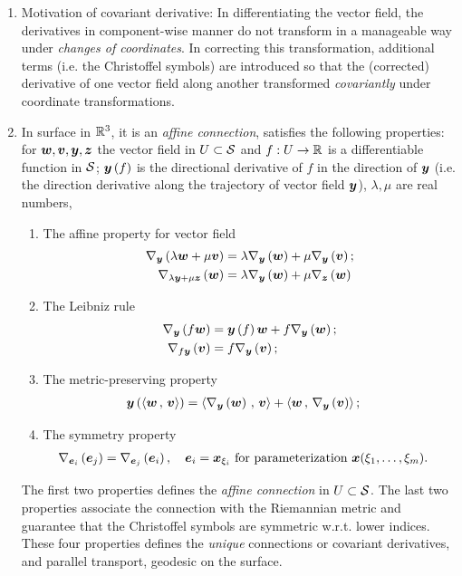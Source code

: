 \documentclass[11pt]{article}
\begin{document}
\begin{enumerate}
\item Motivation of covariant derivative: In differentiating the vector field, the derivatives in component-wise manner do not transform in a manageable way under \emph{changes of coordinates}. In correcting this transformation, additional terms (i.e. the Christoffel symbols) are introduced so that the (corrected) derivative of one vector field along another transformed \emph{covariantly} under coordinate transformations. \\[10pt]

\item In surface in ${\mathbb R}^{3}$, it is an \emph{affine connection}, satisfies the following properties: for $\boldsymbol{w}, \boldsymbol{v}, \boldsymbol{y}, \boldsymbol{z}$ the vector field in $U\subset {\mathcal S}$ and $f: U \rightarrow {\mathbb R}$ is a differentiable function in ${\mathcal S}$; $\boldsymbol{y}\left(f\right)$ is the directional derivative of $f$ in the direction of $\boldsymbol{y}$ (i.e. the direction derivative along the trajectory of vector field $\boldsymbol{y}$), $\lambda, \mu$ are real numbers, 
\begin{enumerate}
\item The affine property for vector field 
 \begin{align*}
\nabla_{\boldsymbol{y}}\left(\lambda\boldsymbol{w}+ \mu\boldsymbol{v}\right) &= \lambda\nabla_{\boldsymbol{y}}\left(\boldsymbol{w}\right)+ \mu\nabla_{\boldsymbol{y}}\left(\boldsymbol{v}\right); \\
\nabla_{\lambda\boldsymbol{y}+ \mu\boldsymbol{z}}\left(\boldsymbol{w}\right) &= \lambda\nabla_{\boldsymbol{y}}\left(\boldsymbol{w}\right)+ \mu\nabla_{\boldsymbol{z}}\left(\boldsymbol{w}\right)
\end{align*}
\item The Leibniz rule
 \begin{align*}
\nabla_{\boldsymbol{y}}\left(f\boldsymbol{w}\right) &= \boldsymbol{y}\left(f\right)\boldsymbol{w}+ f\nabla_{\boldsymbol{y}}\left(\boldsymbol{w}\right);\\
 \nabla_{f\boldsymbol{y}}\left(\boldsymbol{v}\right) &=  f\nabla_{\boldsymbol{y}}\left(\boldsymbol{v}\right);
\end{align*}
\item The metric-preserving property
\begin{align*}
\boldsymbol{y}\left(\left\langle \boldsymbol{w}\,,\, \boldsymbol{v} \right\rangle\right) &= \left\langle \nabla_{\boldsymbol{y}}\left(\boldsymbol{w}\right)\,,\, \boldsymbol{v} \right\rangle + \left\langle \boldsymbol{w}\,,\, \nabla_{\boldsymbol{y}}\left(\boldsymbol{v}\right) \right\rangle;
\end{align*}
\item The symmetry property
\begin{align*}
\nabla_{\boldsymbol{e}_{i}}\left(\boldsymbol{e}_{j}\right) &= \nabla_{\boldsymbol{e}_{j}}\left(\boldsymbol{e}_{i}\right), \quad \boldsymbol{e}_{i} = \boldsymbol{x}_{\xi_{i}}\text{ for parameterization }\boldsymbol{x}(\xi_{1},\ldots, \xi_{m}).
\end{align*}
\end{enumerate}
The first two properties defines the \emph{affine connection} in $U\subset {\mathcal S}$. The last two properties associate the connection with the Riemannian metric and guarantee that the Christoffel symbols are symmetric w.r.t. lower indices.  These four properties defines the \emph{unique} connections or covariant derivatives, and parallel transport, geodesic on the surface. \\


\end{enumerate}
\end{document}

